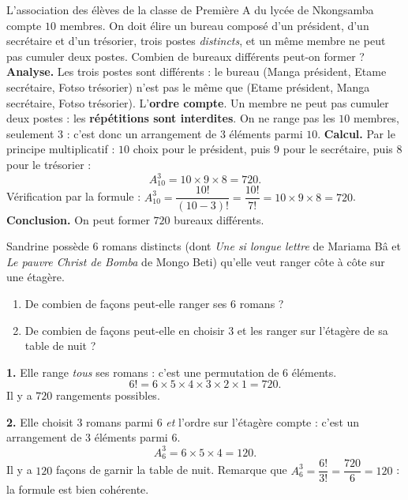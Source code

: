 \documentclass[11pt]{article}
\begin{document}
\begin{exoresolu}
L'association des élèves de la classe de Première A du lycée de Nkongsamba compte $10$ membres. On doit élire un bureau composé d'un président, d'un secrétaire et d'un trésorier, trois postes \emph{distincts}, et un même membre ne peut pas cumuler deux postes. Combien de bureaux différents peut-on former ?
\tcblower
\textbf{Analyse.} Les trois postes sont différents : le bureau (Manga président, Etame secrétaire, Fotso trésorier) n'est pas le même que (Etame président, Manga secrétaire, Fotso trésorier). L'\textbf{ordre compte}. Un membre ne peut pas cumuler deux postes : les \textbf{répétitions sont interdites}. On ne range pas les $10$ membres, seulement $3$ : c'est donc un arrangement de $3$ éléments parmi $10$.
\textbf{Calcul.} Par le principe multiplicatif : $10$ choix pour le président, puis $9$ pour le secrétaire, puis $8$ pour le trésorier :
\[ A_{10}^3 = 10 \times 9 \times 8 = 720. \]
Vérification par la formule : $A_{10}^3 = \dfrac{10!}{(10-3)!} = \dfrac{10!}{7!} = 10 \times 9 \times 8 = 720$.
\textbf{Conclusion.} On peut former $720$ bureaux différents.
\end{exoresolu}

\begin{exoresolu}
Sandrine possède $6$ romans distincts (dont \emph{Une si longue lettre} de Mariama Bâ et \emph{Le pauvre Christ de Bomba} de Mongo Beti) qu'elle veut ranger côte à côte sur une étagère.
\begin{enumerate}
\item De combien de façons peut-elle ranger ses $6$ romans ?
\item De combien de façons peut-elle en choisir $3$ et les ranger sur l'étagère de sa table de nuit ?
\end{enumerate}
\tcblower
\textbf{1.} Elle range \emph{tous} ses romans : c'est une permutation de $6$ éléments.
\[ 6! = 6 \times 5 \times 4 \times 3 \times 2 \times 1 = 720. \]
Il y a $720$ rangements possibles.

\textbf{2.} Elle choisit $3$ romans parmi $6$ \emph{et} l'ordre sur l'étagère compte : c'est un arrangement de $3$ éléments parmi $6$.
\[ A_6^3 = 6 \times 5 \times 4 = 120. \]
Il y a $120$ façons de garnir la table de nuit. Remarque que $A_6^3 = \dfrac{6!}{3!} = \dfrac{720}{6} = 120$ : la formule est bien cohérente.
\end{exoresolu}
\end{document}
